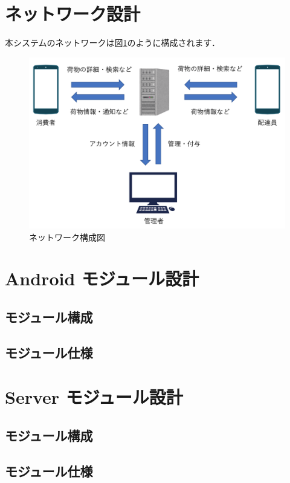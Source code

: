 \documentclass[a4j,titlepage]{jarticle}
\begin{document}
\section{ネットワーク設計}
本システムのネットワークは図\ref{fig:n_d}のように構成されます．

\begin{figure}[H]
 \begin{center}
  \includegraphics[width=140mm]{Network_Diagram.png}
  \caption{ネットワーク構成図}
  \label{fig:n_d}
 \end{center}

\end{figure}

\section{Android モジュール設計}
\subsection{モジュール構成}

\subsection{モジュール仕様}


\section{Server モジュール設計}
\subsection{モジュール構成}
\subsection{モジュール仕様}
\end{document}
